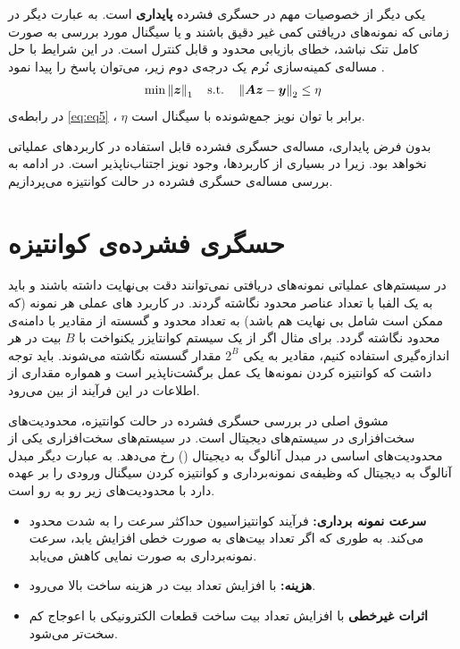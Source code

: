 یکی دیگر از خصوصیات مهم در حسگری فشرده 
\textbf{پایداری}
است. به عبارت دیگر در زمانی که نمونه‌های دریافتی کمی غیر دقیق باشند و یا سیگنال مورد بررسی به صورت کامل تنک نباشد، خطای بازیابی  محدود و قابل کنترل است. در این شرایط با حل مساله‌ی کمینه‌سازی نُرم یک درجه‌ی دوم زیر، می‌توان پاسخ را پیدا نمود
\cite{foucart2013mathematical}.
\begin{align}
\label{eq:eq5}
\min \left\lVert\bm{z}\right\rVert_{1} \quad \text{s.t.} \quad \left\lVert\bm{A}\bm{z}-\bm{y}\right\rVert_{2} \leq \eta
\end{align}
در رابطه‌ی 
\eqref{eq:eq5}
،
$\eta$
برابر با توان نویز جمع‌شونده با سیگنال است.

بدون فرض پایداری، مساله‌ی حسگری فشرده قابل استفاده در کاربرد‌های عملیاتی نخواهد بود. زیرا در بسیاری از کاربرد‌ها، وجود نویز اجتناب‌ناپذیر است. در ادامه به بررسی مساله‌ی حسگری فشرده در حالت کوانتیزه
می‌پردازیم.
\section{حسگری فشرده‌ی کوانتیزه}
در سیستم‌های عملیاتی نمونه‌های دریافتی نمی‌توانند دقت بی‌نهایت داشته باشند و باید به یک الفبا با تعداد عناصر محدود نگاشته گردند.
در کاربرد های عملی هر نمونه (که ممکن است شامل بی نهایت هم باشد) به تعداد محدود و گسسته از مقادیر با دامنه‌ی محدود نگاشته گردد.  برای مثال اگر از یک سیستم کوانتایزر یکنواخت
با 
$ B $
بیت در هر اندازه‌گیری استفاده کنیم، مقادیر به یکی 
$ 2^B $
مقدار گسسته نگاشته می‌شوند. باید توجه داشت که کوانتیزه کردن نمونه‌ها یک عمل برگشت‌ناپذیر است و همواره مقداری از اطلاعات در این فرآیند از بین می‌رود. 

مشوق اصلی در بررسی حسگری فشرده در حالت کوانتیزه، محدودیت‌های سخت‌افزاری در سیستم‌های دیجیتال است. 
در سیستم‌های سخت‌افزاری یکی از محدودیت‌های اساسی در  مبدل آنالوگ به دیجیتال
()
رخ می‌دهد. به عبارت دیگر مبدل آنالوگ به دیجیتال که وظیفه‌ی نمونه‌برداری و کوانتیزه کردن سیگنال ورودی را بر عهده دارد با محدودیت‌های زیر رو به رو است.
\begin{itemize}
\item{
\textbf{سرعت نمونه برداری:}
فرآیند کوانتیزاسیون حداکثر سرعت
را به شدت محدود می‌کند. به طوری که اگر تعداد بیت‌های 
به صورت خطی افزایش یابد، سرعت نمونه‌برداری به صورت نمایی کاهش می‌یابد.
}
\item{
\textbf{هزینه:}
با افزایش تعداد بیت در
هزینه ساخت بالا می‌رود.
}
\item{
\textbf{اثرات غیرخطی}
با افزایش تعداد بیت ساخت قطعات الکترونیکی با اعوجاج کم سخت‌تر می‌شود.
}
\end{itemize}



